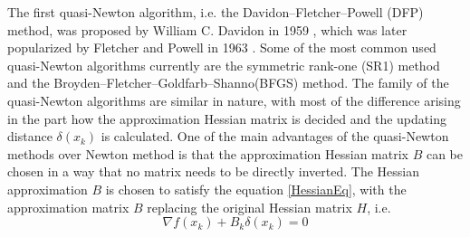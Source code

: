 	The first quasi-Newton algorithm, i.e. the Davidon–Fletcher–Powell (DFP) method, was proposed by William C. Davidon in 1959 \cite{WilDav59}, which was later popularized by Fletcher and Powell in 1963 \cite{FlePow63}. Some of the most common used quasi-Newton algorithms currently are the symmetric rank-one (SR1) method \cite{ANP91} and the Broyden–Fletcher–Goldfarb–Shanno(BFGS) method. The family of the quasi-Newton algorithms are similar in nature, with most of the difference arising in the part how the approximation Hessian matrix is decided and the updating distance $\delta(x_k) $ is calculated. One of the main advantages of the quasi-Newton methods over Newton method is that the approximation Hessian matrix $B$ can be chosen in a way that no matrix needs to be directly inverted. The Hessian approximation $B$ is chosen to satisfy the equation \ref{HessianEq}, with the approximation matrix $B$ replacing the original Hessian matrix $H$, i.e. 
	\begin{equation}
		\nabla f(x_k) +B_k\delta(x_k) =0
		\label{HessianAppro}
	\end{equation}
	
